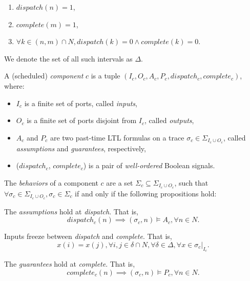 \begin{enumerate}
	\item $ dispatch(n) = 1 $, 
	\item $ complete(m) = 1 $, 
	\item $ \forall k\in (n, m) \cap N, dispatch(k)=0 \wedge complete(k)=0 $.
\end{enumerate}

We denote the set of all such intervals as $\Delta$.

A (scheduled) \emph{component} $c$ is a tuple $(I_c, O_c, A_c, P_c, dispatch_c, complete_c)$, where: 

\begin{itemize}
    	\item $I_c$ is a finite set of ports, called \emph{inputs},
    	\item $O_c$ is a finite set of ports disjoint from $I_c$, called \emph{outputs},
	\item $A_c$ and $P_c$ are two past-time LTL formulas on a trace $\sigma_c \in \Sigma_{I_c \cup O_c}$, called \emph{assumptions} and \emph{guarantees}, respectively,	
    	\item ($dispatch_c$, $complete_c$) is a pair of \emph{well-ordered} Boolean signals.
\end{itemize}

The \emph{behaviors} of a component $c$ are a set $\Sigma_c \subseteq \Sigma_{I_c \cup O_c}$, such that $\forall \sigma_c \in \Sigma_{I_c \cup O_c}, \sigma_c \in \Sigma_c $ if and only if the following propositions hold:

\bigskip
The \emph{assumptions} hold at \emph{dispatch}. That is,
\begin{equation} 
\label{eqn:assumption}
	dispatch_c(n) \implies (\sigma_c, n) \models A_c, \forall n\in N.
\end{equation}

Inputs freeze between \emph{dispatch} and \emph{complete}. That is,
\begin{equation} 
\label{eqn:inputfreeze}
	x(i) = x(j), \forall i,j\in \delta \cap N, \forall \delta \in \Delta, \forall x \in \sigma_c|_{I_c}.
\end{equation}

The \emph{guarantees} hold at \emph{complete}. That is,
\begin{equation} 
\label{eqn:guarantee}
	complete_c(n) \implies (\sigma_c, n) \models P_c, \forall n\in N.
\end{equation}


